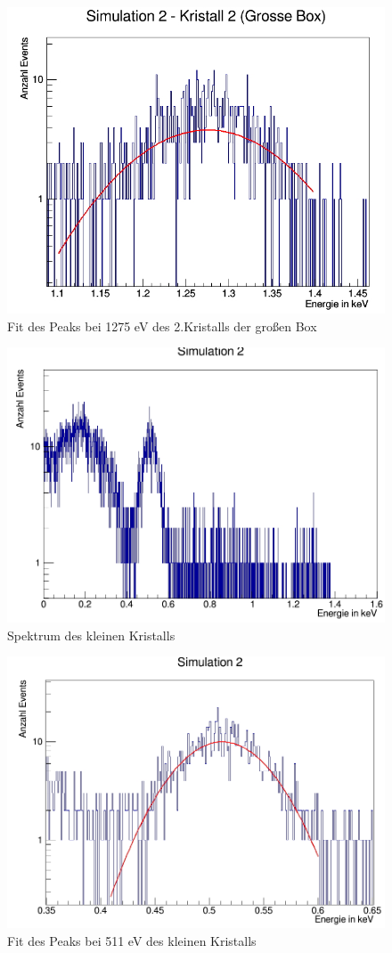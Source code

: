 \documentclass[a4paper,14pt,twoside]{article}
\begin{document}
\begin{figure}[H]
	\begin{center}
		\includegraphics[width=0.7\linewidth]{Simulation2(2KGB)_1275_fitt}
		\caption{Fit des Peaks bei 1275 eV des 2.Kristalls der großen Box}
		\label{}
	\end{center}
\end{figure}

\begin{figure}[H]
	\begin{center}
		\includegraphics[width=0.7\linewidth]{Simulation2_ganz}
		\caption{Spektrum des kleinen Kristalls}
		\label{S2_KB_ganz}
	\end{center}
\end{figure}

\begin{figure}[H]
	\begin{center}
		\includegraphics[width=0.7\linewidth]{Simulation2_511_fit}
		\caption{Fit des Peaks bei 511 eV des kleinen Kristalls}
		\label{}
	\end{center}
\end{figure}
\end{document}
